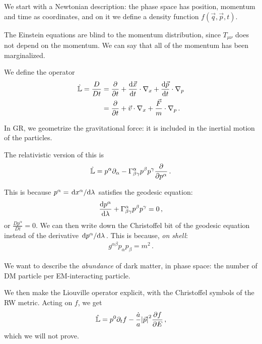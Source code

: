 \documentclass[main.tex]{subfiles}
\begin{document}
We start with a Newtonian description: the phase space has position, momentum and time as coordinates, and on it we define a density function \(f(\vec{q}, \vec{p}, t)\). 

The Einstein equations are blind to the momentum distribution, since \(T_{\mu \nu }\) does not depend on the momentum. We can say that all of the momentum has been marginalized. 

We define the operator 
%
\begin{subequations}
\begin{align}
  \hat{\mathbb{L}} = \frac{D}{Dt} &= \pdv{}{t} + \dv{\vec{x}}{t} \cdot \nabla_x + \dv{\vec{p}}{t} \cdot \nabla_p   \\
  &= \pdv{}{t} + \vec{v} \cdot \nabla_x + \frac{\vec{F}}{m} \cdot \nabla_p 
\,. 
\end{align}
\end{subequations}

In GR, we geometrize the gravitational force: it is included in the inertial motion of the particles. 

The relativistic version of this is 
%
\begin{align}
  \hat{\mathbb{L}} = p^{\alpha } \partial_{\alpha } - \Gamma^{\alpha }_{\beta \gamma } p^{\beta } p^{\gamma } \pdv{}{p^{\alpha }}
\,.
\end{align}
%

This is because \(p^{\alpha } = \dv*{x^{\alpha }}{\lambda }\) satisfies the geodesic equation: 
%
\begin{align}
  \dv{p^{\alpha }}{\lambda } + \Gamma^{\alpha }_{\beta \gamma } p^{\beta } p^{\gamma }=0
\,,
\end{align}
%
or \(\frac{Dp^{\alpha }}{Dt } =0\). We can then write down the Christoffel bit of the geodesic equation instead of the derivative \(\dv*{p^{\alpha }}{\lambda }\). This is because, \emph{on shell}: 
%
\begin{align}
  g^{\alpha \beta } p_{\alpha } p_{\beta } = m^2
\,. 
\end{align}

We want to describe the \emph{abundance} of dark matter, in phase space: the number of DM particle per EM-interacting particle. 

We then make the Liouville operator explicit, with the Christoffel symbols of the RW metric. Acting on \(f\), we get 
%
\begin{align}
  \hat{\mathbb{L}}  = p^{0} \partial_t f - \frac{\dot{a}}{a} \abs{\vec{p}}^2 \pdv{f}{E}
\,,
\end{align}
%
which we will not prove. 
\end{document}
